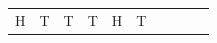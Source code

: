 {\begin{tabular}[t]{|l|l|l|l|l|l|l|l|l|l|}
        H &
        T &
        T &
        T &
        H &
        T%
     \tabularnewline\cline{1-1}\cline{2-2}\cline{3-3}\cline{4-4}\cline{5-5}\cline{6-6}\cline{7-7}\cline{8-8}\cline{9-9}\cline{10-10}
    \end{tabular}} %
        \addtolength{\mytableboxheight}{\mytableboxdepth}
